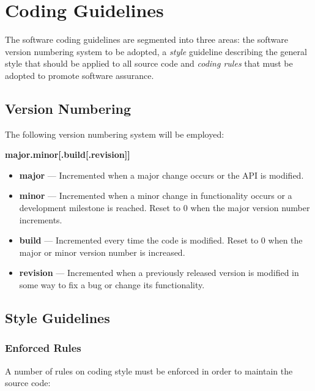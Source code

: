 \chapter{Coding Guidelines}
\label{ch_rules}

The software coding guidelines are segmented into three areas: the software version numbering system to be adopted, a \textit{style} guideline describing the general style that should be applied to all source code and \textit{coding rules} that must be adopted to promote software assurance.

\section{Version Numbering}

The following version numbering system will be employed:

\textbf{major.minor[.build[.revision]]}

\begin{itemize}
\item \textbf{major} --- Incremented when a major change occurs or the API is modified.
\item \textbf{minor} --- Incremented when a minor change in functionality occurs or a development milestone is reached. Reset to 0 when the major version number increments.
\item \textbf{build} --- Incremented every time the code is modified. Reset to 0 when the major or minor version number is increased.
\item \textbf{revision} --- Incremented when a previously released version is modified in some way to fix a bug or change its functionality.
\end{itemize}


\section{Style Guidelines}

\subsection{Enforced Rules}
A number of rules on coding style must be enforced in order to maintain the source code:


